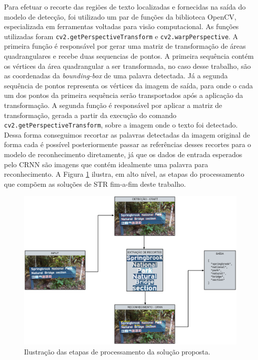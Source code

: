 Para efetuar o recorte das regiões de texto localizadas e fornecidas na saída do modelo de detecção, foi utilizado um par de funções da biblioteca 
OpenCV, especializada em ferramentas voltadas para visão computacional. As funções utilizadas foram \texttt{cv2.getPerspectiveTransform} e 
\texttt{cv2.warpPerspective}.
A primeira função é responsável por gerar uma matriz de transformação de áreas quadrangulares e recebe duas sequencias de pontos. A primeira 
sequência contém os vértices da área quadrangular a ser transformada, no caso desse trabalho, são as coordenadas da \textit{bounding-box} de uma 
palavra detectada. Já a segunda sequência de pontos representa os vértices da imagem de saída, para onde o cada um dos pontos da primeira 
sequência serão transportados após a aplicação da transformação.
A segunda função é responsável por aplicar a matriz de transformação, gerada a partir da execução do comando \texttt{cv2.getPerspectiveTransform}, 
sobre a imagem onde o texto foi detectado. Dessa forma conseguimos recortar as palavras detectadas da imagem original de forma cada é possível 
posteriormente passar as referências desses recortes para o modelo de reconhecimento diretamente, já que os dados de entrada esperados pelo CRNN 
são imagens que contém idealmente uma palavra para reconhecimento. A Figura \ref{fig:methodology_pipeline} ilustra, em alto nível, as etapas do 
processamento que compõem as soluções de STR fim-a-fim deste trabalho.

\begin{figure}
    \centering
    \includegraphics[width=\textwidth]{figs/metodologia-pipeline.png}
    \caption{Ilustração das etapas de processamento da solução proposta.}
    \label{fig:methodology_pipeline}
\end{figure}

